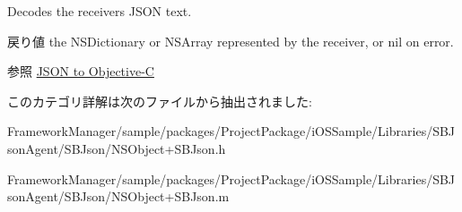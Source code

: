 Decodes the receiver\textquotesingle{}s J\+S\+O\+N text. 

\begin{DoxyReturn}{戻り値}
the N\+S\+Dictionary or N\+S\+Array represented by the receiver, or nil on error.
\end{DoxyReturn}
\begin{DoxySeeAlso}{参照}
\hyperlink{json2objc}{J\+S\+O\+N to Objective-\/\+C} 
\end{DoxySeeAlso}


このカテゴリ詳解は次のファイルから抽出されました\+:\begin{DoxyCompactItemize}
\item 
Framework\+Manager/sample/packages/\+Project\+Package/i\+O\+S\+Sample/\+Libraries/\+S\+B\+Json\+Agent/\+S\+B\+Json/N\+S\+Object+\+S\+B\+Json.\+h\item 
Framework\+Manager/sample/packages/\+Project\+Package/i\+O\+S\+Sample/\+Libraries/\+S\+B\+Json\+Agent/\+S\+B\+Json/N\+S\+Object+\+S\+B\+Json.\+m\end{DoxyCompactItemize}
